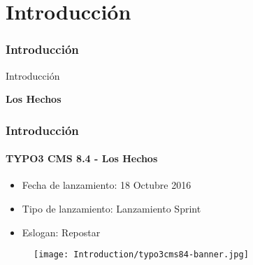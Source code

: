 %

\section{Introducción}
\begin{frame}[fragile]
	\frametitle{Introducción}

	\begin{center}\huge{Introducción}\end{center}
	\begin{center}\huge{\color{typo3darkgrey}\textbf{Los Hechos}}\end{center}

\end{frame}

\begin{frame}[fragile]
	\frametitle{Introducción}
	\framesubtitle{TYPO3 CMS 8.4 - Los Hechos}

	\begin{itemize}
		\item Fecha de lanzamiento: 18 Octubre 2016
		\item Tipo de lanzamiento: Lanzamiento Sprint
		\item Eslogan: Repostar
	\end{itemize}

	\begin{figure}
		\texttt{[image: Introduction/typo3cms84-banner.jpg]}
	\end{figure}

\end{frame}

